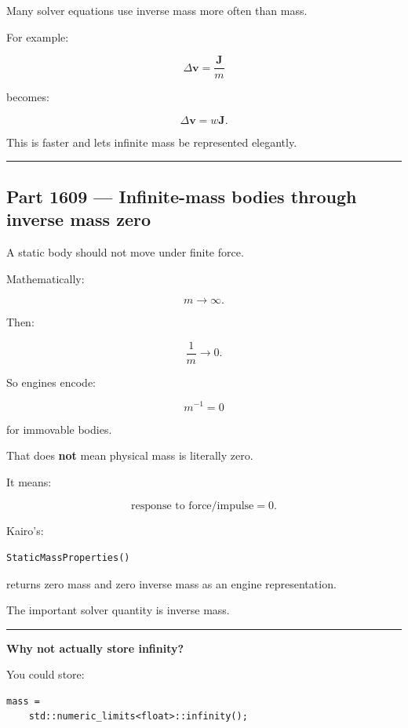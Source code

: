 Many solver equations use inverse mass more often than mass.

For example:

\[
\Delta\mathbf{v}
=
\frac{\mathbf{J}}{m}
\]

becomes:

\[
\boxed{
\Delta\mathbf{v}
=
w\mathbf{J}.
}
\]

This is faster and lets infinite mass be represented elegantly.

\begin{center}\rule{0.5\linewidth}{0.5pt}\end{center}

\subsection{Part 1609 --- Infinite-mass bodies through inverse mass zero}\label{06-engine-ii-ch034-part-1609-infinite-mass-bodies-through-inverse-mass-zero}

A static body should not move under finite force.

Mathematically:

\[
m\rightarrow\infty.
\]

Then:

\[
\frac{1}{m}
\rightarrow0.
\]

So engines encode:

\[
\boxed{
m^{-1}=0
}
\]

for immovable bodies.

That does \textbf{not} mean physical mass is literally zero.

It means:

\[
\text{response to force/impulse}=0.
\]

Kairo's:

\begin{verbatim}
StaticMassProperties()
\end{verbatim}

returns zero mass and zero inverse mass as an engine representation.

The important solver quantity is inverse mass.

\begin{center}\rule{0.5\linewidth}{0.5pt}\end{center}

\textbf{Why not actually store infinity?}

You could store:

\begin{verbatim}
mass =
    std::numeric_limits<float>::infinity();
\end{verbatim}

